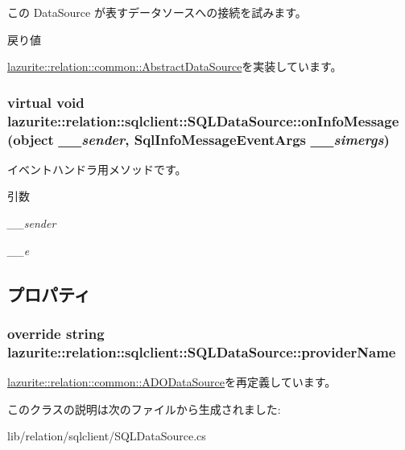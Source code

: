 この DataSource が表すデータソースへの接続を試みます。 \begin{DoxyReturn}{戻り値}

\end{DoxyReturn}


\hyperlink{classlazurite_1_1relation_1_1common_1_1_abstract_data_source_a1706b5b8821b00ad2391dd0fcf98a767}{lazurite::relation::common::AbstractDataSource}を実装しています。\hypertarget{classlazurite_1_1relation_1_1sqlclient_1_1_s_q_l_data_source_a52af111a1f9f4d865dcd0d84e166543b}{
\subsubsection[{onInfoMessage}]{\setlength{\rightskip}{0pt plus 5cm}virtual void lazurite::relation::sqlclient::SQLDataSource::onInfoMessage (object {\em \_\-\_\-sender}, \/  SqlInfoMessageEventArgs {\em \_\-\_\-simergs})}}
\label{classlazurite_1_1relation_1_1sqlclient_1_1_s_q_l_data_source_a52af111a1f9f4d865dcd0d84e166543b}


イベントハンドラ用メソッドです。 
\begin{DoxyParams}{引数}
\item[{\em \_\-\_\-sender}]\item[{\em \_\-\_\-e}]\end{DoxyParams}


\subsection{プロパティ}
\hypertarget{classlazurite_1_1relation_1_1sqlclient_1_1_s_q_l_data_source_afb9ccecb64b77e0ff36d1b55a52af87f}{
\subsubsection[{providerName}]{\setlength{\rightskip}{0pt plus 5cm}override string lazurite::relation::sqlclient::SQLDataSource::providerName}}
\label{classlazurite_1_1relation_1_1sqlclient_1_1_s_q_l_data_source_afb9ccecb64b77e0ff36d1b55a52af87f}


\hyperlink{classlazurite_1_1relation_1_1common_1_1_a_d_o_data_source_ad238c170cf658cfdc3a1cf1843aeb956}{lazurite::relation::common::ADODataSource}を再定義しています。

このクラスの説明は次のファイルから生成されました:\begin{DoxyCompactItemize}
\item 
lib/relation/sqlclient/SQLDataSource.cs\end{DoxyCompactItemize}
